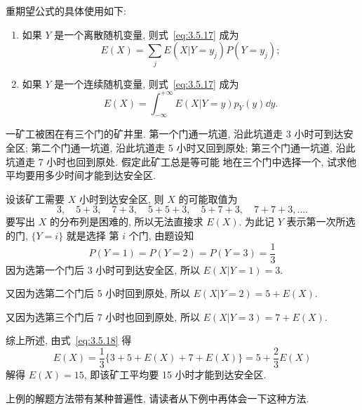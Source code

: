 	重期望公式的具体使用如下:
	\begin{enumerate}
		\item 如果 $Y$ 是一个离散随机变量, 则式~\eqref{eq:3.5.17} 成为
			\begin{equation}
				E(X)=\sum_{j} E\left(X | Y=y_{j}\right) P\left(Y=y_{j}\right);\label{eq:3.5.18}
			\end{equation}
		\item 如果 $Y$ 是一个连续随机变量, 则式~\eqref{eq:3.5.17} 成为
			\begin{equation}
				E(X)=\int_{-\infty}^{+\infty} E(X | Y=y) p_{Y}(y) \dd y.\label{eq:3.5.19}
			\end{equation}
	\end{enumerate}
	\begin{example}\label{exam:3.5.7}
		一矿工被困在有三个门的矿井里. 第一个门通一坑道, 沿此坑道走 3 小时可到达安全区; 第二个门通一坑道,
		沿此坑道走 5 小时又回到原处; 第三个门通一坑道, 沿此坑道走 7 小时也回到原处. 假定此矿工总是等可能
		地在三个门中选择一个, 试求他平均要用多少时间才能到达安全区.
	\end{example}
	\begin{solution}
		设该矿工需要 $X$ 小时到达安全区, 则 $X$ 的可能取值为
		\[
			3,\quad 5+3,\quad 7+3,\quad 5+5+3,\quad 5+7+3,\quad 7+7+3,\ldots.\]
		要写出 $X$ 的分布列是困难的, 所以无法直接求 $E(X)$. 为此记 $Y$ 表示第一次所选的门, $\{Y=i\}$ 就是选择
		第 $i$ 个门, 由题设知
		\[
			P(Y=1)=P(Y=2)=P(Y=3)=\frac{1}{3}\]
		因为选第一个门后 3 小时可到达安全区, 所以 $E(X|Y=1)=3$.

		又因为选第二个门后 5 小时回到原处, 所以 $E(X|Y=2)=5+E(X)$.

		又因为选第三个门后 7 小时也回到原处, 所以 $E(X|Y=3)=7+E(X)$.

		综上所述, 由式~\eqref{eq:3.5.18} 得
		\[
			E(X)=\frac{1}{3}\{3+5+E(X)+7+E(X)\}=5+\frac{2}{3} E(X)\]
			解得 $E(X)=15$, 即该矿工平均要 15 小时才能到达安全区.
	\end{solution}
	上例的解题方法带有某种普遍性, 请读者从下例中再体会一下这种方法.

